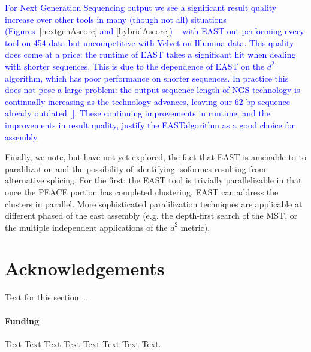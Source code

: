 \documentclass{bioinfo}
\newcommand{\peace} {{\small PEACE}}
\newcommand{\east} {{\small EAST}}
\newcommand{\velvet}{{\small Velvet}}
\begin{document}
\textcolor{blue}{For Next Generation Sequencing output we see a significant result
quality increase over other tools in many (though not all) situations
(Figures~\ref{nextgenAscore} and \ref{hybridAscore}) -- with \east\/
out performing every tool on 454 data but uncompetitive with \velvet\/
on Illumina data.  This quality does come at a price: the runtime of
\east\/ takes a significant hit when dealing with shorter sequences.
This is due to the dependence of \east\/ on the $d^2$ algorithm, which
has poor performance on shorter sequences.  In practice this does not
pose a large problem: the output sequence length of NGS technology
is continually increasing as the technology advances, leaving
our 62 bp sequence already outdated [\cite{Eid09,Li10}].   These
continuing improvements in runtime, and the improvements in result
quality, justify the \east algorithm as a good choice for assembly.}


Finally, we note, but have not yet explored, the fact that \east\/ is
amenable to to paralilization and the possibility of identifying
isoformes resulting from alternative splicing.  For the first: the
\east\/ tool is trivially parallelizable in that once the \peace\/
portion has completed clustering, \east\/ can address the clusters in
parallel.  More sophisticated paralilization techniques are applicable
at different phased of the east assembly (e.g. the depth-first search
of the MST, or the multiple independent applications of the $d^2$ metric).  


\section*{Acknowledgements}
  Text for this section \ldots

\paragraph{Funding\textcolon} Text Text Text Text Text Text  Text Text.


\end{document}
